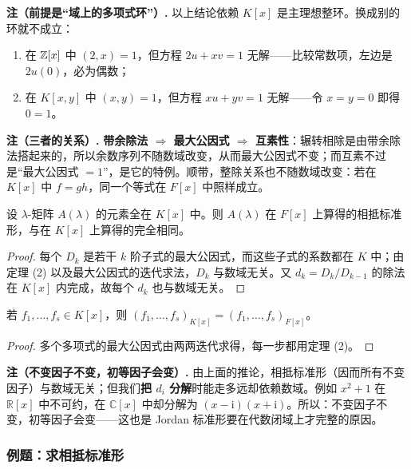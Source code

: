 \noindent\textbf{注（前提是“域上的多项式环”）.} 以上结论依赖 \(K[x]\) 是主理想整环。换成别的环就不成立：
\begin{enumerate}[label=(\arabic*)]
  \item 在 \(\mathbb{Z}[x]\) 中 \((2,x)=1\)，但方程 \(2u+xv=1\) 无解——比较常数项，左边是 \(2u(0)\)，必为偶数；
  \item 在 \(K[x,y]\) 中 \((x,y)=1\)，但方程 \(xu+yv=1\) 无解——令 \(x=y=0\) 即得 \(0=1\)。
\end{enumerate}

\noindent\textbf{注（三者的关系）.} \textbf{带余除法 \(\Rightarrow\) 最大公因式 \(\Rightarrow\) 互素性}：辗转相除是由带余除法搭起来的，所以余数序列不随数域改变，从而最大公因式不变；而互素不过是“最大公因式 \(=1\)”，是它的特例。顺带，整除关系也不随数域改变：若在 \(K[x]\) 中 \(f=gh\)，同一个等式在 \(F[x]\) 中照样成立。

\begin{corollary}[扩域不改变相抵标准形]
设 \(\lambda\)-矩阵 \(A(\lambda)\) 的元素全在 \(K[x]\) 中。则 \(A(\lambda)\) 在 \(F[x]\) 上算得的相抵标准形，与在 \(K[x]\) 上算得的完全相同。
\end{corollary}

\begin{proof}
每个 \(D_k\) 是若干 \(k\) 阶子式的最大公因式，而这些子式的系数都在 \(K\) 中；由定理 (2) 以及最大公因式的迭代求法，\(D_k\) 与数域无关。又 \(d_k=D_k/D_{k-1}\) 的除法在 \(K[x]\) 内完成，故每个 \(d_k\) 也与数域无关。
\end{proof}

\begin{corollary}[多个多项式的情形]
若 \(f_1,\dots,f_s\in K[x]\)，则 \((f_1,\dots,f_s)_{K[x]}=(f_1,\dots,f_s)_{F[x]}\)。
\end{corollary}

\begin{proof}
多个多项式的最大公因式由两两迭代求得，每一步都用定理 (2)。
\end{proof}

\noindent\textbf{注（不变因子不变，初等因子会变）.} 由上面的推论，相抵标准形（因而所有不变因子）与数域无关；但我们\textbf{把 \(d_i\) 分解}时能走多远却依赖数域。例如 \(x^2+1\) 在 \(\mathbb{R}[x]\) 中不可约，在 \(\mathbb{C}[x]\) 中却分解为 \((x-\mathrm{i})(x+\mathrm{i})\)。所以：不变因子不变，初等因子会变——这也是 Jordan 标准形要在代数闭域上才完整的原因。

\subsubsection{例题：求相抵标准形}

